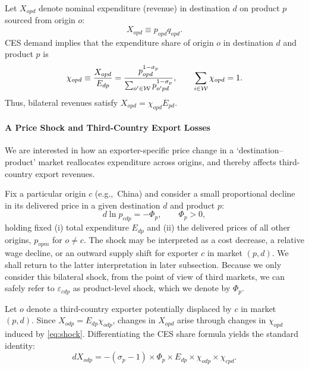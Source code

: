 \documentclass[english,12pt]{article}
\theoremstyle{definition}
\begin{document}
Let $X_{opd}$ denote nominal expenditure (revenue) in destination $d$ on
product $p$ sourced from origin $o$: 
\begin{equation*}
X_{opd}\equiv p_{opd}q_{opd}.
\end{equation*}%
CES demand implies that the expenditure share of origin $o$ in destination $%
d $ and product $p$ is 
\begin{equation}
\chi _{opd}\equiv \frac{X_{opd}}{E_{dp}}=\frac{p_{opd}^{1-\sigma _{p}}}{%
\sum_{o^{\prime }\in \mathcal{W}}p_{o^{\prime }pd}^{1-\sigma _{p}}},\qquad
\sum_{i\in \mathcal{W}}\chi _{opd}=1.
\end{equation}%
Thus, bilateral revenues satisfy $X_{opd}=\chi _{opd}E_{pd}$.

\paragraph{A Price Shock and Third-Country Export Losses}

We are interested in how an exporter-specific price change in a
`destination--product' market reallocates expenditure across origins, and
thereby affects third-country export revenues.

Fix a particular origin $c$ (e.g.,\ China) and consider a small proportional
decline in its delivered price in a given destination $d$ and product $p$: 
\begin{equation}
d\ln p_{cdp}=-\Phi _{p},\qquad \Phi _{p}>0,
\label{eq:shock}
\end{equation}%
holding fixed (i) total expenditure $E_{dp}$ and (ii) the delivered prices
of all other origins, $p_{opm}$ for $o\neq c$. The shock may be interpreted
as a cost decrease, a relative wage decline, or an outward supply shift for
exporter $c$ in market $(p,d)$. We shall return to the latter interpretation
in later subsection. Because we only consider this bilateral shock, from the
point of view of third markets, we can safely refer to $\varepsilon _{cdp}$
as product-level shock, which we denote by $\Phi _{p}$.

Let $o$ denote a third-country exporter potentially displaced by $c$ in
market $(p,d)$. Since $X_{odp}=E_{dp}\chi _{odp}$, changes in $X_{opd}$
arise through changes in $\chi _{opd}$ induced by \eqref{eq:shock}.
Differentiating the CES share formula yields the standard identity: 
\begin{equation}
dX_{odp}=-(\sigma _{p}-1)\times \Phi _{p}\times E_{dp}\times \chi
_{odp}\times \chi _{cpd}.  \label{eq:key_identity}
\end{equation}
\end{document}
